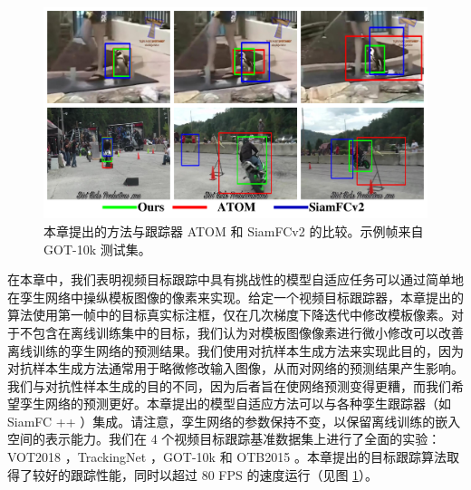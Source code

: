 \begin{figure}[t]
    \centering
    \includegraphics[width=1.0\textwidth]{Img/MTP/got10k/visulization2.pdf}
    \caption{本章提出的方法与跟踪器 ATOM \cite{danelljan2019atom} 和 SiamFCv2 \cite{SiamFC} 的比较。示例帧来自 GOT-10k \cite{GOT-10k} 测试集。}
    \label{fig:vis}
\end{figure}

在本章中，我们表明视频目标跟踪中具有挑战性的模型自适应任务可以通过简单地在孪生网络中操纵模板图像的像素来实现。给定一个视频目标跟踪器，本章提出的算法使用第一帧中的目标真实标注框，仅在几次梯度下降迭代中修改模板像素。对于不包含在离线训练集中的目标，我们认为对模板图像像素进行微小修改可以改善离线训练的孪生网络的预测结果。我们使用对抗样本生成方法来实现此目的，因为对抗样本生成方法通常用于略微修改输入图像，从而对网络的预测结果产生影响。我们与对抗性样本生成的目的不同，因为后者旨在使网络预测变得更糟，而我们希望孪生网络的预测更好。本章提出的模型自适应方法可以与各种孪生跟踪器（如 SiamFC ++ \cite{SiamFC++}）集成。请注意，孪生网络的参数保持不变，以保留离线训练的嵌入空间的表示能力。我们在 4 个视频目标跟踪基准数据集上进行了全面的实验：VOT2018 \cite{kristan2018sixth}，TrackingNet \cite{muller2018trackingnet}，GOT-10k \cite{GOT-10k} 和 OTB2015 \cite{OTB}。本章提出的目标跟踪算法取得了较好的跟踪性能，同时以超过 80 FPS 的速度运行（见图 \ref{fig:vis}）。
